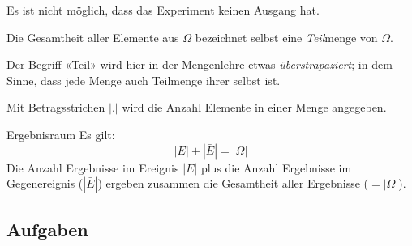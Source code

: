 Es ist nicht möglich, dass das Experiment keinen Ausgang hat.


\begin{bemerkung}{}{}
Die Gesamtheit aller Elemente aus $\Omega$ bezeichnet selbst eine
\textit{Teil}menge von $\Omega$.

Der Begriff «Teil» wird hier in der Mengenlehre etwas \textit{überstrapaziert}; in dem Sinne, dass jede Menge auch
  Teilmenge ihrer selbst ist.
\end{bemerkung}

\begin{definition}{}{}
Mit Betragsstrichen $|.|$ wird die Anzahl Elemente in einer Menge angegeben.
\end{definition}

\begin{bemerkung}{Ergebnisraum}{}
  Es gilt: $$|E| + |{\bar{E}}| = |\Omega|$$
  Die Anzahl Ergebnisse im Ereignis $|E|$ plus die Anzahl Ergebnisse im Gegenereignis ($|\bar{E}|$) ergeben zusammen die Gesamtheit aller Ergebnisse ($=|\Omega|$).
\end{bemerkung}

\subsection*{Aufgaben}

\newpage
